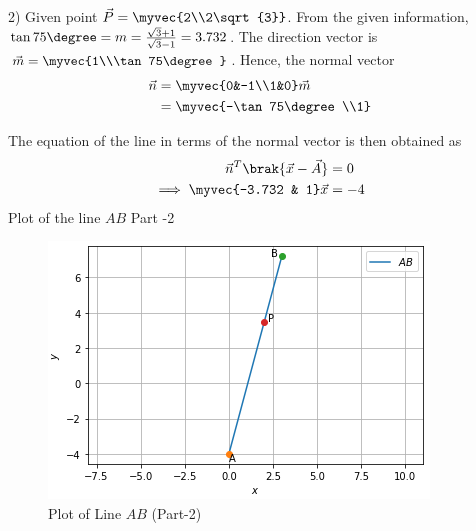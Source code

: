\documentclass[journal,12pt,twocolumn]{IEEEtran}
\begin{document}
2) Given point $\vec{P} = \myvec{2\\2\sqrt{3}}$.
From the given information, $\tan75\degree =m = \frac{\sqrt{3}+1}{\sqrt{3}-1} = 3.732$.
The direction vector is $\vec{m} = \myvec{1\\\tan75\degree}$.  
Hence, the normal vector
\begin{align}
\label{eq:line_norm_dir}
\vec{n} &= \myvec{0&-1\\1&0}\vec{m} 
\\
&= \myvec{-\tan75\degree\\1}
\end{align}

The equation of the line in terms of the normal vector is then obtained as
\begin{align}
\label{eq:line_norm_vec}
\vec{n}^T\brak{\vec{x}-\vec{A}} &= 0
\\
\implies \myvec{-3.732 & 1} \vec{x} &= -4
\end{align}
Plot of the line $AB$ Part -2

\begin{figure}[ht]
    \centering
    \includegraphics[width=\columnwidth]{Line_Plot_Part2.PNG}
    \caption{Plot of Line $AB$ (Part-2)}
\end{figure}
\end{document}
